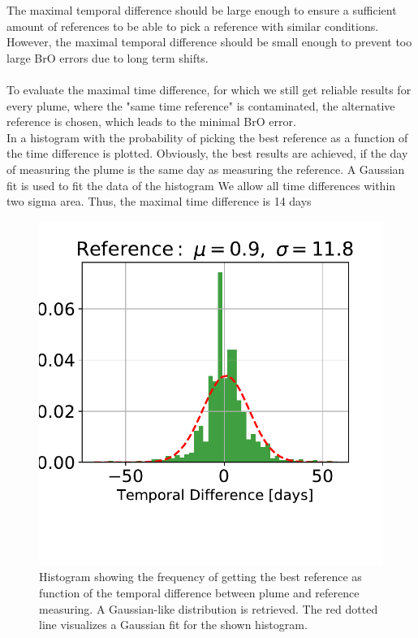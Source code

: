 The maximal temporal difference should be large enough to ensure a sufficient amount of references to be able to pick a reference with similar conditions. However, the maximal temporal difference should be small enough to prevent too large BrO errors due to long term shifts.\\
\\
To evaluate the maximal time difference, for which we still get reliable results for every plume, where the "same time reference" is contaminated, the alternative reference is chosen, which leads to the minimal BrO error.\\
%
In  a histogram with the probability of picking the best reference as a function of the time difference is plotted. Obviously, the best results are achieved, if the day of measuring the plume is the same day as measuring the reference. A Gaussian fit is used to fit the data of the histogram We allow all time differences within two sigma area. Thus, the maximal time difference is 14 days\\
\begin{figure}
	\centering
	\includegraphics[width=0.7\linewidth]{Bilder/Hist}
	\caption{Histogram showing the frequency of getting the best reference as function of the temporal difference between plume and reference measuring. A Gaussian-like distribution is retrieved. The red dotted line visualizes a Gaussian fit for the shown histogram.}
	\label{fig:Hist}
\end{figure}
